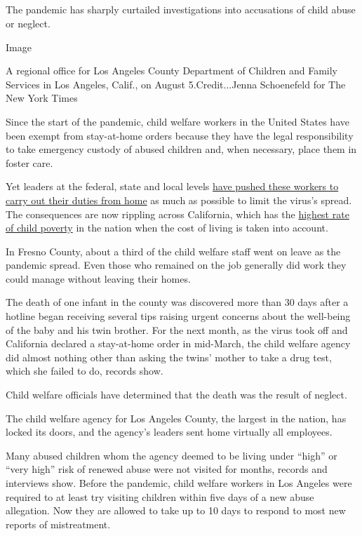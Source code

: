 \hypertarget{-8}{%
\subsection{}\label{-8}}

The pandemic has sharply curtailed investigations into accusations of
child abuse or neglect.

Image

A regional office for Los Angeles County Department of Children and
Family Services in Los Angeles, Calif., on August 5.Credit...Jenna
Schoenefeld for The New York Times

Since the start of the pandemic, child welfare workers in the United
States have been exempt from stay-at-home orders because they have the
legal responsibility to take emergency custody of abused children and,
when necessary, place them in foster care.

Yet leaders at the federal, state and local levels
\href{https://www.nytimes3xbfgragh.onion/2020/08/07/us/virus-child-abuse.html}{have
pushed these workers to carry out their duties from home} as much as
possible to limit the virus's spread. The consequences are now rippling
across California, which has the
\href{https://edsource.org/2018/child-poverty-drops-in-california-but-is-still-the-nations-highest/596285}{highest
rate of child poverty} in the nation when the cost of living is taken
into account.

In Fresno County, about a third of the child welfare staff went on leave
as the pandemic spread. Even those who remained on the job generally did
work they could manage without leaving their homes.

The death of one infant in the county was discovered more than 30 days
after a hotline began receiving several tips raising urgent concerns
about the well-being of the baby and his twin brother. For the next
month, as the virus took off and California declared a stay-at-home
order in mid-March, the child welfare agency did almost nothing other
than asking the twins' mother to take a drug test, which she failed to
do, records show.

Child welfare officials have determined that the death was the result of
neglect.

The child welfare agency for Los Angeles County, the largest in the
nation, has locked its doors, and the agency's leaders sent home
virtually all employees.

Many abused children whom the agency deemed to be living under ``high''
or ``very high'' risk of renewed abuse were not visited for months,
records and interviews show. Before the pandemic, child welfare workers
in Los Angeles were required to at least try visiting children within
five days of a new abuse allegation. Now they are allowed to take up to
10 days to respond to most new reports of mistreatment.

